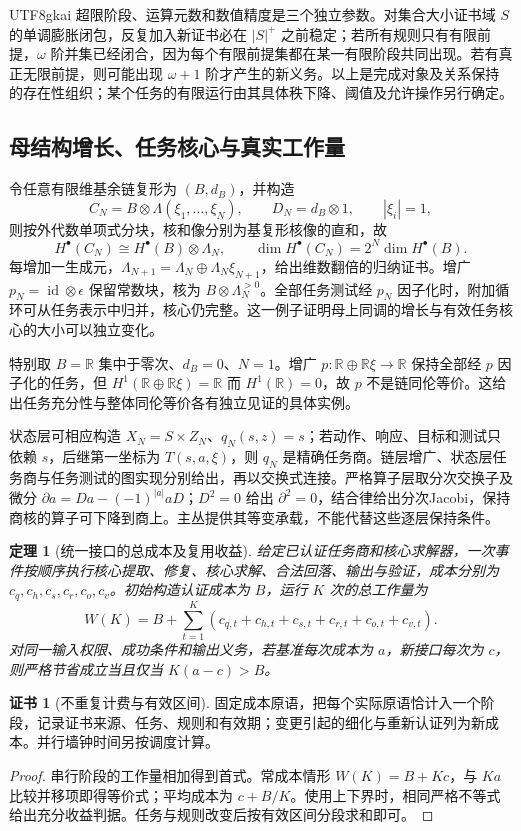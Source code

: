 \documentclass[11pt,a4paper]{article}
\theoremstyle{plain}
\newtheorem{theorem}{定理}[section]
\theoremstyle{definition}
\newtheorem*{certificate}{证书}
\theoremstyle{remark}
\begin{document}
\begin{CJK*}{UTF8}{gkai}
超限阶段、运算元数和数值精度是三个独立参数。对集合大小证书域 $S$ 的单调膨胀闭包，反复加入新证书必在 $|S|^+$ 之前稳定；若所有规则只有有限前提，$\omega$ 阶并集已经闭合，因为每个有限前提集都在某一有限阶段共同出现。若有真正无限前提，则可能出现 $\omega+1$ 阶才产生的新义务。以上是完成对象及关系保持的存在性组织；某个任务的有限运行由其具体秩下降、阈值及允许操作另行确定。

\subsection{母结构增长、任务核心与真实工作量}

令任意有限维基余链复形为 $(B,d_B)$，并构造
\[
 C_N=B\otimes\Lambda(\xi_1,\ldots,\xi_N),\qquad
 D_N=d_B\otimes1,\qquad |\xi_i|=1,
\]
则按外代数单项式分块，核和像分别为基复形核像的直和，故
\[
 H^\bullet(C_N)\cong H^\bullet(B)\otimes\Lambda_N,
 \qquad \dim H^\bullet(C_N)=2^N\dim H^\bullet(B).
\]
每增加一生成元，$\Lambda_{N+1}=\Lambda_N\oplus\Lambda_N\xi_{N+1}$，给出维数翻倍的归纳证书。增广 $p_N=\operatorname{id}\otimes\epsilon$ 保留常数块，核为 $B\otimes\Lambda_N^{>0}$。全部任务测试经 $p_N$ 因子化时，附加循环可从任务表示中归并，核心仍完整。这一例子证明母上同调的增长与有效任务核心的大小可以独立变化。

特别取 $B=\mathbb R$ 集中于零次、$d_B=0$、$N=1$。增广
$p:\mathbb R\oplus\mathbb R\xi\to\mathbb R$ 保持全部经 $p$ 因子化的任务，但
$H^1(\mathbb R\oplus\mathbb R\xi)=\mathbb R$ 而 $H^1(\mathbb R)=0$，故 $p$ 不是链同伦等价。这给出任务充分性与整体同伦等价各有独立见证的具体实例。

状态层可相应构造 $X_N=S\times Z_N$、$q_N(s,z)=s$；若动作、响应、目标和测试只依赖 $s$，后继第一坐标为 $T(s,a,\xi)$，则 $q_N$ 是精确任务商。链层增广、状态层任务商与任务测试的图实现分别给出，再以交换式连接。严格算子层取分次交换子及微分 $\partial a=Da-(-1)^{|a|}aD$；$D^2=0$ 给出 $\partial^2=0$，结合律给出分次Jacobi，保持商核的算子可下降到商上。主丛提供其等变承载，不能代替这些逐层保持条件。

\begin{theorem}[统一接口的总成本及复用收益]
\label{pc:cost}
给定已认证任务商和核心求解器，一次事件按顺序执行核心提取、修复、核心求解、合法回落、输出与验证，成本分别为 $c_q,c_h,c_s,c_r,c_o,c_v$。初始构造认证成本为 $B$，运行 $K$ 次的总工作量为
\[
 W(K)=B+\sum_{t=1}^K
 (c_{q,t}+c_{h,t}+c_{s,t}+c_{r,t}+c_{o,t}+c_{v,t}).
\]
对同一输入权限、成功条件和输出义务，若基准每次成本为 $a$，新接口每次为 $c$，则严格节省成立当且仅当 $K(a-c)>B$。
\end{theorem}
\begin{certificate}[不重复计费与有效区间]
固定成本原语，把每个实际原语恰计入一个阶段，记录证书来源、任务、规则和有效期；变更引起的细化与重新认证列为新成本。并行墙钟时间另按调度计算。
\end{certificate}
\begin{proof}
串行阶段的工作量相加得到首式。常成本情形 $W(K)=B+Kc$，与 $Ka$ 比较并移项即得等价式；平均成本为 $c+B/K$。使用上下界时，相同严格不等式给出充分收益判据。任务与规则改变后按有效区间分段求和即可。
\end{proof}


\end{CJK*}
\end{document}
